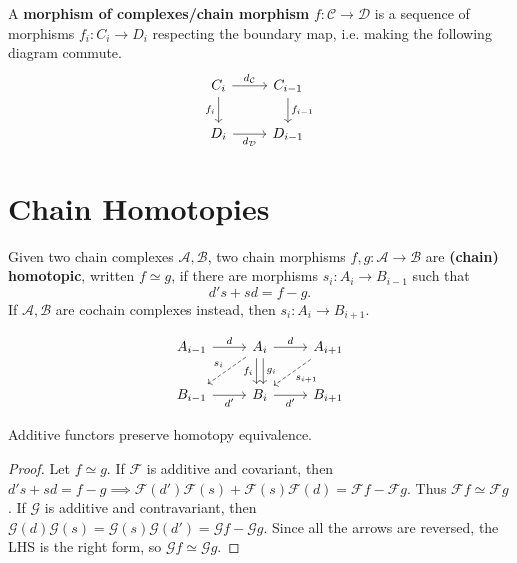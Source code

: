 \documentclass[twoside,10pt]{report}
\begin{document}
A \textbf{morphism of complexes/chain morphism} $f:\mathcal{C}\to \mathcal{D}$ is a sequence of morphisms $f_i:C_i\to D_i$ respecting the boundary map, i.e. making the following diagram commute.
\[
	\begin{tikzcd}
		C_i \arrow[d, "f_i"'] \arrow[r, "d_\mathcal{C}"] & C_{i-1} \arrow[d, "f_{i-1}"] \\
		D_i \arrow[r, "d_\mathcal{D}"']                & D_{i-1}
	\end{tikzcd}
\]


\section{Chain Homotopies}

\begin{defn}[]
Given two chain complexes $\mathcal{A},\mathcal{B}$, two chain morphisms $f,g:\mathcal{A}\to \mathcal{B}$ are \textbf{(chain) homotopic}, written $f \simeq g$, if there are morphisms $s_i:A_i\to B_{i-1}$ such that
\[
	d's + sd = f-g.
\]
If $\mathcal{A}, \mathcal{B}$ are cochain complexes instead, then $s_i:A_{i}\to B_{i+1}$.
\end{defn}
\[
\begin{tikzcd}
	A_{i-1} \rar{d} & A_i \rar{d}\dar[shift right, "f_i"']\dar[shift left]{g_i}\arrow[dl,dashed,"s_i"'] & A_{i+1} \arrow[dl,dashed,"s_{i+1}"] \\
	B_{i-1} \rar["d'"'] & B_i \rar["d'"'] & B_{i+1}
\end{tikzcd}
\] 

\begin{prop}
	\label{functors-preserve-homotopy}
Additive functors preserve homotopy equivalence.
\end{prop}
\begin{proof}
	Let $f\simeq g$. If $\mathcal{F}$ is additive and covariant, then $d's+sd = f-g \implies \mathcal{F}(d')\mathcal{F}(s)+\mathcal{F}(s)\mathcal{F}(d) = \mathcal{F}f - \mathcal{F}g$. Thus $\mathcal{F}f \simeq \mathcal{F}g$. If $\mathcal{G}$ is additive and contravariant, then $\mathcal{G}(d)\mathcal{G}(s) = \mathcal{G}(s)\mathcal{G}(d') = \mathcal{G}f-\mathcal{G}g$. Since all the arrows are reversed, the LHS is the right form, so $\mathcal{G}f \simeq \mathcal{G}g$.
\end{proof}
\end{document}
